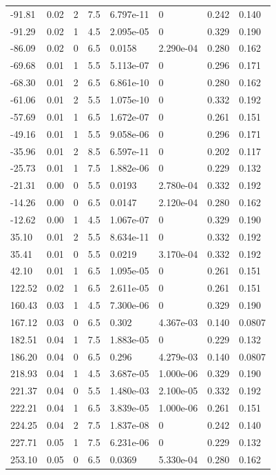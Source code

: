 \documentclass[preview]{standalone}
\begin{document}
{{\begin{tabular}{L{1.2cm}C{1.2cm} C{0.3cm}C{0.5cm} C{1.4cm}C{1.4cm} C{1.4cm}C{1.4cm}}
  -91.81  &  0.02  & 2     & 7.5 &  6.797e-11  & 0  & 0.242 &  0.140   \\ 
  -91.29  &  0.02  & 1     & 4.5 &  2.095e-05  & 0  & 0.329 &  0.190   \\ 
  -86.09  &  0.02  & 0     & 6.5 &  0.0158  & 2.290e-04  & 0.280 &  0.162   \\ 
  -69.68  &  0.01  & 1     & 5.5 &  5.113e-07  & 0  & 0.296 &  0.171   \\ 
  -68.30  &  0.01  & 2     & 6.5 &  6.861e-10  & 0  & 0.280 &  0.162   \\ 
  -61.06  &  0.01  & 2     & 5.5 &  1.075e-10  & 0  & 0.332 &  0.192   \\ 
  -57.69  &  0.01  & 1     & 6.5 &  1.672e-07  & 0  & 0.261 &  0.151   \\ 
  -49.16  &  0.01  & 1     & 5.5 &  9.058e-06  & 0  & 0.296 &  0.171   \\ 
  -35.96  &  0.01  & 2     & 8.5 &  6.597e-11  & 0  & 0.202 &  0.117   \\ 
  -25.73  &  0.01  & 1     & 7.5 &  1.882e-06  & 0  & 0.229 &  0.132   \\ 
  -21.31  &  0.00  & 0     & 5.5 &  0.0193  & 2.780e-04  & 0.332 &  0.192   \\ 
  -14.26  &  0.00  & 0     & 6.5 &  0.0147  & 2.120e-04  & 0.280 &  0.162   \\ 
  -12.62  &  0.00  & 1     & 4.5 &  1.067e-07  & 0  & 0.329 &  0.190   \\ 
  35.10  &  0.01  & 2     & 5.5 &  8.634e-11  & 0  & 0.332 &  0.192   \\ 
  35.41  &  0.01  & 0     & 5.5 &  0.0219  & 3.170e-04  & 0.332 &  0.192   \\ 
  42.10  &  0.01  & 1     & 6.5 &  1.095e-05  & 0  & 0.261 &  0.151   \\ 
  122.52  &  0.02  & 1     & 6.5 &  2.611e-05  & 0  & 0.261 &  0.151   \\ 
  160.43  &  0.03  & 1     & 4.5 &  7.300e-06  & 0  & 0.329 &  0.190   \\ 
  167.12  &  0.03  & 0     & 6.5 &  0.302  & 4.367e-03  & 0.140 &  0.0807   \\ 
  182.51  &  0.04  & 1     & 7.5 &  1.883e-05  & 0  & 0.229 &  0.132   \\ 
  186.20  &  0.04  & 0     & 6.5 &  0.296  & 4.279e-03  & 0.140 &  0.0807   \\ 
  218.93  &  0.04  & 1     & 4.5 &  3.687e-05  & 1.000e-06  & 0.329 &  0.190   \\ 
  221.37  &  0.04  & 0     & 5.5 &  1.480e-03  & 2.100e-05  & 0.332 &  0.192   \\ 
  222.21  &  0.04  & 1     & 6.5 &  3.839e-05  & 1.000e-06  & 0.261 &  0.151   \\ 
  224.25  &  0.04  & 2     & 7.5 &  1.837e-08  & 0  & 0.242 &  0.140   \\ 
  227.71  &  0.05  & 1     & 7.5 &  6.231e-06  & 0  & 0.229 &  0.132   \\ 
  253.10  &  0.05  & 0     & 6.5 &  0.0369  & 5.330e-04  & 0.280 &  0.162   \\ 
\hline 
\end{tabular} 

}}
\end{document}
